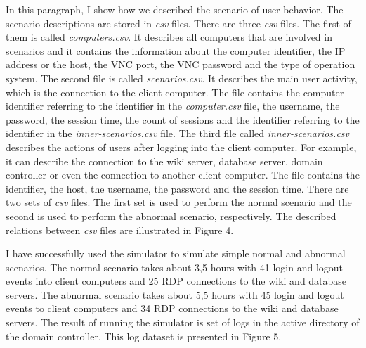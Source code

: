 


In this paragraph, I show how we described the scenario of user behavior. The scenario descriptions are stored in \textit{csv} files. There are three \textit{csv} files. The first of them is called \textit{computers.csv}. It describes all computers that are involved in scenarios and it contains the information about the computer identifier, the IP address or the host, the VNC port, the VNC password and the type of operation system.
The second file is called \textit{scenarios.csv}. It describes the main user activity, which is the connection to the client computer. The file contains the computer identifier referring to the identifier in the \textit{computer.csv} file, the username, the password, the session time, the count of sessions and the identifier referring to the identifier in the \textit{inner-scenarios.csv} file. The third file called \textit{inner-scenarios.csv} describes the actions of users after logging into the client computer. For example, it can describe the connection to the wiki server, database server, domain controller or even the connection to another client computer. The file contains the identifier, the host, the username, the password and the session time. There are two sets of \textit{csv} files. The first set is used to perform the normal scenario and the second is used to perform the abnormal scenario, respectively. The described relations between \textit{csv} files are illustrated in Figure 4.
 	
 	
I have successfully used the simulator to simulate simple normal and abnormal scenarios. The normal scenario takes about 3,5 hours with 41 login and logout events into client computers and 25 RDP connections to the wiki and database servers. The abnormal scenario takes about 5,5 hours with 45 login and logout events to client computers and 34 RDP connections to the wiki and database servers. The result of running the simulator is set of logs in the active directory of the domain controller. This log dataset is presented in Figure 5. 


 
% 